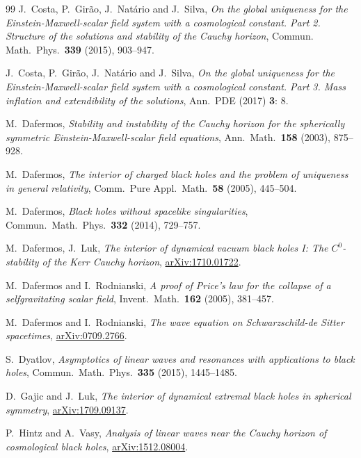 \documentclass[a4paper,11pt,oneside,reqno]{amsart}
\begin{document}
\begin{thebibliography}{99}
{J.~Costa, P.~Gir\~ao, J.~Nat\'ario and J.~Silva}, \emph{{On the global uniqueness for the Einstein-Maxwell-scalar field system with a cosmological constant. Part 2. Structure of the solutions and stability of the Cauchy horizon}}, Commun. Math.\ Phys.\ {\bf 339} (2015), 903--947.

{J.~Costa, P.~Gir\~ao, J.~Nat\'ario and J.~Silva}, \emph{{On the global uniqueness for the Einstein-Maxwell-scalar field system with a cosmological constant. Part 3. Mass inflation and extendibility of the solutions}}, Ann.\ PDE (2017) {\bf 3}: 8.

{M.~Dafermos}, \emph{{Stability and instability of the Cauchy horizon for the spherically symmetric Einstein-Maxwell-scalar field equations}}, Ann.\ Math.~\textbf{158} (2003), 875--928.

{M.~Dafermos}, \emph{{The interior of charged black holes and the problem of uniqueness in general relativity}}, Comm.\ Pure Appl.\ Math.~\textbf{58} (2005), 445--504.
  
{M.~Dafermos}, \emph{{Black holes without spacelike singularities}}, Commun.\ Math.\ Phys.\ {\bf 332} (2014), 729--757.

M.~Dafermos, J.~Luk, \emph{The interior of dynamical vacuum black holes I: The $C^0$-stability of the Kerr Cauchy horizon}, \href{http://arxiv.org/abs/1710.01722}{arXiv:1710.01722}.
 
{M.~Dafermos and I.~Rodnianski}, \emph{{A proof of Price's law for the collapse of a selfgravitating scalar field}}, Invent.\ Math.\ \textbf{162} (2005), 381--457.  
  
M.~Dafermos and I.~Rodnianski, \emph{{The wave equation on Schwarzschild-de Sitter spacetimes}}, \href{http://arxiv.org/abs/0709.2766}{arXiv:0709.2766}.
    
S.~Dyatlov, \emph{Asymptotics of linear waves and resonances with applications to black holes}, Commun.\ Math.\ Phys.\ {\bf 335} (2015), 1445--1485.

D.~Gajic and J.~Luk, \emph{The interior of dynamical extremal black holes in spherical symmetry}, \href{http://arxiv.org/abs/1709.09137}{arXiv:1709.09137}.

 P.~Hintz and A.~Vasy, \emph{Analysis of linear waves near the Cauchy horizon of cosmological black holes}, \href{http://arxiv.org/abs/1512.08004}{arXiv:1512.08004}.


\end{thebibliography}
\end{document}
